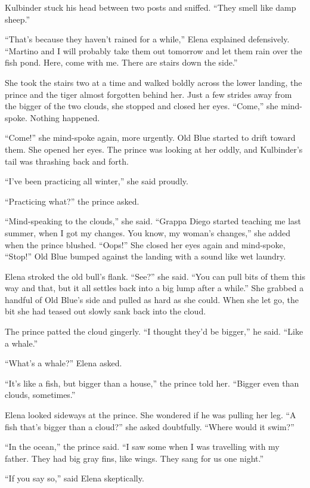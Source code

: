 \documentclass[10pt]{book}
\begin{document}
Kulbinder stuck his head between two posts and sniffed. ``They smell like damp sheep.''

``That's because they haven't rained for a while,'' Elena explained defensively. ``Martino and I will probably take them out tomorrow and let them rain over the fish pond. Here, come with me. There are stairs down the side.''

She took the stairs two at a time and walked boldly across the lower landing, the prince and the tiger almost forgotten behind her. Just a few strides away from the bigger of the two clouds, she stopped and closed her eyes. ``Come,'' she mind-spoke. Nothing happened.

``Come!'' she mind-spoke again, more urgently. Old Blue started to drift toward them. She opened her eyes. The prince was looking at her oddly, and Kulbinder's tail was thrashing back and forth.

``I've been practicing all winter,'' she said proudly.

``Practicing what?'' the prince asked.

``Mind-speaking to the clouds,'' she said. ``Grappa Diego started teaching me last summer, when I got my changes. You know, my woman's changes,'' she added when the prince blushed. ``Oops!'' She closed her eyes again and mind-spoke, ``Stop!'' Old Blue bumped against the landing with a sound like wet laundry.

Elena stroked the old bull's flank. ``See?'' she said. ``You can pull bits of them this way and that, but it all settles back into a big lump after a while.'' She grabbed a handful of Old Blue's side and pulled as hard as she could. When she let go, the bit she had teased out slowly sank back into the cloud.

The prince patted the cloud gingerly. ``I thought they'd be bigger,'' he said. ``Like a whale.''

``What's a whale?'' Elena asked.

``It's like a fish, but bigger than a house,'' the prince told her. ``Bigger even than clouds, sometimes.''

Elena looked sideways at the prince. She wondered if he was pulling her leg. ``A fish that's bigger than a cloud?'' she asked doubtfully. ``Where would it swim?''

``In the ocean,'' the prince said. ``I saw some when I was travelling with my father. They had big gray fins, like wings. They sang for us one night.''

``If you say so,'' said Elena skeptically.
\end{document}
